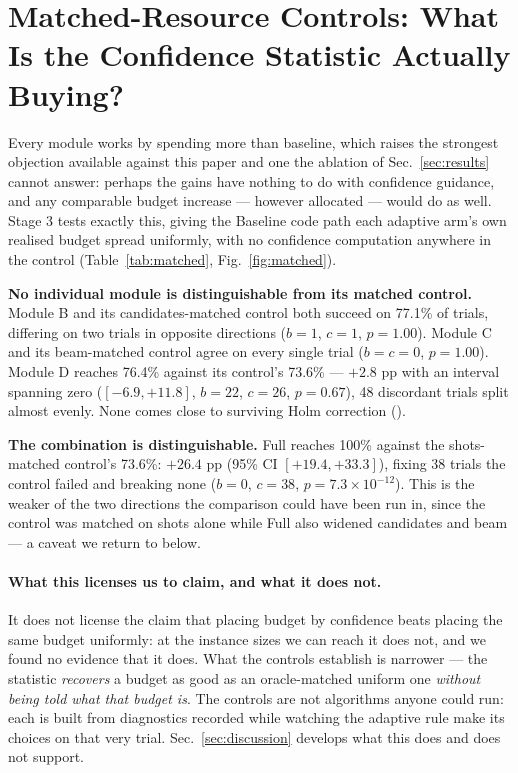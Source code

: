 \section{Matched-Resource Controls: What Is the Confidence Statistic
Actually Buying?}
\label{sec:matched}

Every module works by spending more than baseline, which raises the
strongest objection available against this paper and one the ablation of
Sec.~\ref{sec:results} cannot answer: perhaps the gains have nothing to
do with confidence guidance, and any comparable budget increase ---
however allocated --- would do as well. Stage 3 tests exactly this, giving
the Baseline code path each adaptive arm's own realised budget spread
uniformly, with no confidence computation anywhere in the control
(Table~\ref{tab:matched}, Fig.~\ref{fig:matched}).

\textbf{No individual module is distinguishable from its matched
control.} Module B and its candidates-matched control both succeed on
77.1\% of trials, differing on two trials in opposite directions
($b{=}1$, $c{=}1$, $p=1.00$). Module C and its beam-matched control agree
on every single trial ($b{=}c{=}0$, $p=1.00$). Module D reaches 76.4\%
against its control's 73.6\% --- $+2.8$ pp with an interval spanning zero
($[-6.9,+11.8]$, $b{=}22$, $c{=}26$, $p=0.67$), 48 discordant trials
split almost evenly. None comes close to surviving Holm correction
(\SItables{}).

\textbf{The combination is distinguishable.} Full reaches 100\% against
the shots-matched control's 73.6\%: $+26.4$ pp (95\% CI $[+19.4,+33.3]$),
fixing 38 trials the control failed and breaking none ($b{=}0$, $c{=}38$,
$p=7.3\times10^{-12}$). This is the weaker of the two directions the
comparison could have been run in, since the control was matched on shots
alone while Full also widened candidates and beam --- a caveat we return
to below.

\paragraph{What this licenses us to claim, and what it does not.} It does
not license the claim that placing budget by confidence beats placing the
same budget uniformly: at the instance sizes we can reach it does not,
and we found no evidence that it does. What the controls establish is
narrower --- the statistic \emph{recovers} a budget as good as an
oracle-matched uniform one \emph{without being told what that budget
is}. The controls are not algorithms anyone could run: each is built from
diagnostics recorded while watching the adaptive rule make its choices on
that very trial. Sec.~\ref{sec:discussion} develops what this does and
does not support.

